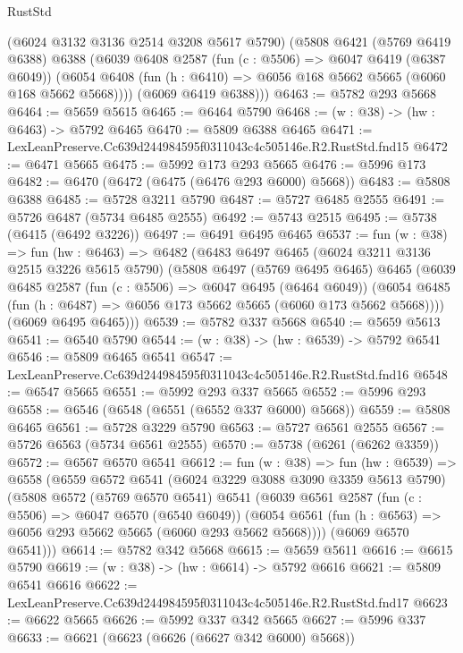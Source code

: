 \begin{lexlean}{RustStd}
\begin{coremodule}
      (@6024 @3132 @3136 @2514 @3208 @5617 @5790)
      (@5808
        @6421
        (@5769 @6419 @6388)
        @6388
        (@6039
          @6408
          @2587
          (fun (c : @5506) => @6047 @6419 (@6387 @6049))
          (@6054 @6408 (fun (h : @6410) => @6056 @168 @5662 @5665 (@6060 @168 @5662 @5668))))
        (@6069 @6419 @6388)))
@6463 := @5782 @293 @5668
@6464 := @5659 @5615
@6465 := @6464 @5790
@6468 := (w : @38) -> (hw : @6463) -> @5792 @6465
@6470 := @5809 @6388 @6465
@6471 := LexLeanPreserve.Cc639d244984595f0311043c4c505146e.R2.RustStd.fnd15
@6472 := @6471 @5665
@6475 := @5992 @173 @293 @5665
@6476 := @5996 @173
@6482 := @6470 (@6472 (@6475 (@6476 @293 @6000) @5668))
@6483 := @5808 @6388
@6485 := @5728 @3211 @5790
@6487 := @5727 @6485 @2555
@6491 := @5726 @6487 (@5734 @6485 @2555)
@6492 := @5743 @2515
@6495 := @5738 (@6415 (@6492 @3226))
@6497 := @6491 @6495 @6465
@6537 := fun (w : @38) =>
  fun (hw : @6463) =>
  @6482
    (@6483
      @6497
      @6465
      (@6024 @3211 @3136 @2515 @3226 @5615 @5790)
      (@5808
        @6497
        (@5769 @6495 @6465)
        @6465
        (@6039
          @6485
          @2587
          (fun (c : @5506) => @6047 @6495 (@6464 @6049))
          (@6054 @6485 (fun (h : @6487) => @6056 @173 @5662 @5665 (@6060 @173 @5662 @5668))))
        (@6069 @6495 @6465)))
@6539 := @5782 @337 @5668
@6540 := @5659 @5613
@6541 := @6540 @5790
@6544 := (w : @38) -> (hw : @6539) -> @5792 @6541
@6546 := @5809 @6465 @6541
@6547 := LexLeanPreserve.Cc639d244984595f0311043c4c505146e.R2.RustStd.fnd16
@6548 := @6547 @5665
@6551 := @5992 @293 @337 @5665
@6552 := @5996 @293
@6558 := @6546 (@6548 (@6551 (@6552 @337 @6000) @5668))
@6559 := @5808 @6465
@6561 := @5728 @3229 @5790
@6563 := @5727 @6561 @2555
@6567 := @5726 @6563 (@5734 @6561 @2555)
@6570 := @5738 (@6261 (@6262 @3359))
@6572 := @6567 @6570 @6541
@6612 := fun (w : @38) =>
  fun (hw : @6539) =>
  @6558
    (@6559
      @6572
      @6541
      (@6024 @3229 @3088 @3090 @3359 @5613 @5790)
      (@5808
        @6572
        (@5769 @6570 @6541)
        @6541
        (@6039
          @6561
          @2587
          (fun (c : @5506) => @6047 @6570 (@6540 @6049))
          (@6054 @6561 (fun (h : @6563) => @6056 @293 @5662 @5665 (@6060 @293 @5662 @5668))))
        (@6069 @6570 @6541)))
@6614 := @5782 @342 @5668
@6615 := @5659 @5611
@6616 := @6615 @5790
@6619 := (w : @38) -> (hw : @6614) -> @5792 @6616
@6621 := @5809 @6541 @6616
@6622 := LexLeanPreserve.Cc639d244984595f0311043c4c505146e.R2.RustStd.fnd17
@6623 := @6622 @5665
@6626 := @5992 @337 @342 @5665
@6627 := @5996 @337
@6633 := @6621 (@6623 (@6626 (@6627 @342 @6000) @5668))

\end{coremodule}
\end{lexlean}
